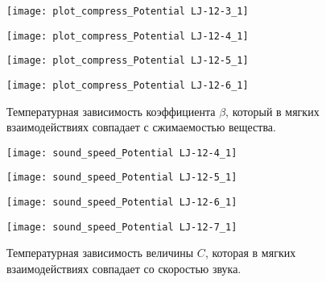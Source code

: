 \begin{figure}[h]
\begin{center}
\begin{minipage}[h]{0.45\linewidth}
\texttt{[image: plot\_compress\_Potential LJ-12-3\_1]}
\end{minipage}
\begin{minipage}[h]{0.45\linewidth}
\texttt{[image: plot\_compress\_Potential LJ-12-4\_1]}
\end{minipage}

\begin{minipage}[h]{0.45\linewidth}
\texttt{[image: plot\_compress\_Potential LJ-12-5\_1]}
\end{minipage}
\begin{minipage}[h]{0.45\linewidth}
\texttt{[image: plot\_compress\_Potential LJ-12-6\_1]}
\end{minipage}
\caption{Температурная зависимость коэффициента $\beta$, который в мягких взаимодействиях совпадает с сжимаемостью вещества.}
\label{risBeta}
\end{center}
\end{figure}


\begin{figure}[h]
\begin{center}
\begin{minipage}[h]{0.45\linewidth}
\texttt{[image: sound\_speed\_Potential LJ-12-4\_1]}
\end{minipage}
\begin{minipage}[h]{0.45\linewidth}
\texttt{[image: sound\_speed\_Potential LJ-12-5\_1]}
\end{minipage}

\begin{minipage}[h]{0.45\linewidth}
\texttt{[image: sound\_speed\_Potential LJ-12-6\_1]}
\end{minipage}
\begin{minipage}[h]{0.45\linewidth}
\texttt{[image: sound\_speed\_Potential LJ-12-7\_1]}
\end{minipage}
\caption{Температурная зависимость величины $C$, которая в мягких взаимодействиях совпадает со скоростью звука.}
\label{risC}
\end{center}
\end{figure}

